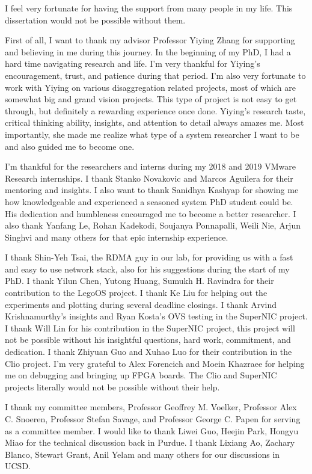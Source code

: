 \begin{acknowledgements}

I feel very fortunate for having the support from many people in my life.
This dissertation would not be possible without them.

First of all, I want to thank my advisor Professor Yiying Zhang for supporting and believing in me during this journey.
In the beginning of my PhD, I had a hard time navigating research and life. I'm very thankful for Yiying's encouragement, trust, and patience during that period.
I'm also very fortunate to work with Yiying on various disaggregation related projects, most of which are somewhat big and grand vision projects.
This type of project is not easy to get through,
but definitely a rewarding experience once done.
Yiying's research taste, critical thinking ability, insights, and attention to detail always amazes me.
Most importantly, she made me realize what type of  a system researcher I want to be and also guided me to become one.

I'm thankful for the researchers and interns during my 2018 and 2019 VMware Research internships.
I thank Stanko Novakovic and Marcos Aguilera for their mentoring and insights.
I also want to thank Sanidhya Kashyap for showing me how knowledgeable and experienced a seasoned system PhD student could be. His dedication and humbleness encouraged me to become a better researcher.
I also thank Yanfang Le, Rohan Kadekodi, Soujanya Ponnapalli, Weili Nie, Arjun Singhvi and many others for that epic internship experience.

I thank Shin-Yeh Tsai, the RDMA guy in our lab, for providing us with a fast and easy to use network stack, also for his suggestions during the start of my PhD.
I thank Yilun Chen, Yutong Huang, Sumukh H. Ravindra for their contribution to the LegoOS project.
I thank Ke Liu for helping out the experiments and plotting during several deadline closings.
I thank Arvind Krishnamurthy's insights and Ryan Kosta's OVS testing in the SuperNIC project.
I thank Will Lin for his contribution in the SuperNIC project,
this project will not be possible without his insightful questions, hard work, commitment, and dedication.
I thank Zhiyuan Guo and Xuhao Luo for their contribution in the Clio project.
I'm very grateful to Alex Forencich and Moein Khazraee for helping me on debugging and bringing up FPGA boards.
The Clio and SuperNIC projects literally would not be possible without their help.

I thank my committee members, Professor Geoffrey M. Voelker, Professor Alex C. Snoeren, Professor Stefan Savage, and Professor George C. Papen for serving as a committee member.
%
I would like to thank Liwei Guo, Heejin Park, Hongyu Miao for the technical discussion back in Purdue. I thank Lixiang Ao, Zachary Blanco, Stewart Grant, Anil Yelam and many others for our discussions in UCSD.


\end{acknowledgements}
